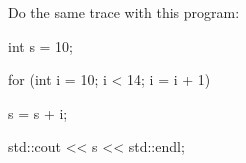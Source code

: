 Do the same trace with this program:

\begin{console}

int s = 10;

for (int i = 10; i < 14; i = i + 1)

{   

    s = s + i;

}

std::cout << s << std::endl;

\end{console}

